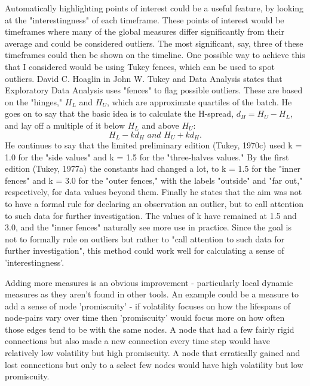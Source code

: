 Automatically highlighting points of interest could be a useful feature, by looking at the "interestingness" of each timeframe. These points of interest would be timeframes where many of the global measures differ significantly from their average and could be considered outliers. The most significant, say, three of these timeframes could then be shown on the timeline. One possible way to achieve this that I considered would be using Tukey fences, which can be used to spot outliers. David C. Hoaglin in John W. Tukey and Data Analysis \cite{jwtada} states that Exploratory Data Analysis\cite{eda} uses "fences" to flag possible outliers. These are based on the "hinges," $H_L$ and $H_U$, which are approximate quartiles of the batch. He goes on to say that the basic idea is to calculate the H-spread, $d_H = H_U - H_L$, and lay off a multiple of it below $H_L$ and above $H_U$: 
\begin{equation}
 H_L-kd_H \, \, and \, \, H_U + kd_H.
\end{equation}
He continues to say that the limited preliminary edition (Tukey, 1970c) used k = 1.0 for the "side values" and k = 1.5 for the "three-halves values." By the first edition (Tukey, 1977a) the constants had changed a lot, to k = 1.5 for the "inner fences" and k = 3.0 for the "outer fences," with the labels "outside" and "far out," respectively, for data values beyond them.
Finally he states that the aim was not to have a formal rule for declaring an observation an outlier, but to call attention to such data for further investigation. The values of k have remained at 1.5 and 3.0, and the "inner fences" naturally see more use in practice. 
Since the goal is not to formally rule on outliers but rather to "call attention to such data for further investigation", this method could work well for calculating a sense of 'interestingness'.
\newline

Adding more measures is an obvious improvement - particularly local dynamic measures as they aren't found in other tools. An example could be a measure to add a sense of node 'promiscuity' - if volatility focuses on how the lifespans of node-pairs vary over time then 'promiscuity' would focus more on how often those edges tend to be with the same nodes. A node that had a few fairly rigid connections but also made a new connection every time step would have relatively low volatility but high promiscuity. A node that erratically gained and lost connections but only to a select few nodes would have high volatility but low promiscuity.
\newline


